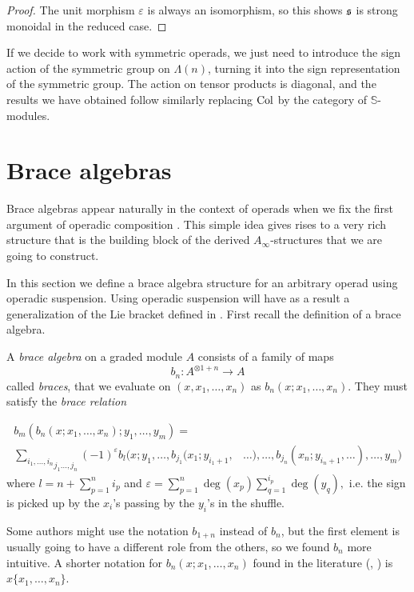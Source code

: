 \documentclass[Thesis.tex]{subfiles}
\begin{document}
\begin{proof}
The unit morphism $\varepsilon$ is always an isomorphism, so this shows $\mathfrak{s}$ is strong monoidal in the reduced case.

\end{proof}

\begin{remark}
If we decide to work with symmetric operads, we just need to introduce the sign action of the symmetric group on $\Lambda(n)$, turning it into the sign representation of the symmetric group. The action on tensor products is diagonal, and the results we have obtained follow similarly replacing $\mathrm{Col}$ by the category of $\mathbb{S}$-modules.
\end{remark}

\section{Brace algebras}\label{sectionbraces}
Brace algebras appear naturally in the context of operads when we fix the first argument of operadic composition \cite{GV}. This simple idea gives rises to a very rich structure that is the building block of the derived $A_\infty$-structures that we are going to construct.

In this section we define a brace algebra structure for an arbitrary operad using operadic suspension. Using operadic suspension will have as a result  a generalization of the Lie bracket defined in \cite{RW}. First recall the definition of a brace algebra.

\begin{defin}\label{braces}
A \emph{brace algebra} on a graded module $A$ consists of a family of maps \[b_n:A^{\otimes 1+n}\to A\] called \emph{braces}, that we evaluate on $(x,x_1,\dots, x_n)$ as $b_n(x;x_1,\dots, x_n)$. They must satisfy the \emph{brace relation}


\begin{align*}
b_m(b_n(x;x_1,\dots, x_n);y_1,\dots,y_m)=&\\
\underset{j_1\dots, j_n}{\sum_{i_1,\dots, i_n}}(-1)^{\varepsilon}b_l(x; y_1,\dots,b_{j_1}(x_1;y_{i_1+1},&\dots),\dots, b_{j_n}(x_n;y_{i_n+1},\dots),\dots,y_m)
\end{align*}
where $l=n+\sum_{p=1}^n i_p$ and $\varepsilon=\sum_{p=1}^n\deg(x_p)\sum_{q=1}^{i_p}\deg(y_q),$ i.e. the sign is picked up by the $x_i$'s passing by the $y_i$'s in the shuffle.
\end{defin}

\begin{remark}
Some authors might use the notation $b_{1+n}$ instead of $b_n$, but the first element is usually going to have a different role from the others, so we found $b_n$ more intuitive. A shorter notation for $b_n(x;x_1,\dots,x_n)$ found in the literature (\cite{GV}, \cite{getzler}) is $x\{x_1,\dots, x_n\}$. 
\end{remark}
\end{document}
